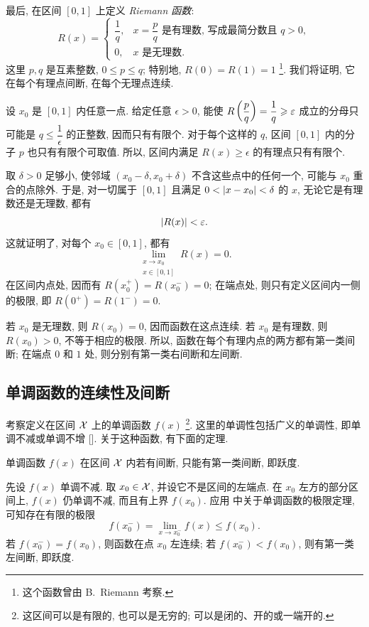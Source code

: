 \label{ex:riemann_function_continuity}
最后, 在区间 $[0,1]$ 上定义 \emph{Riemann 函数}:
$$
R(x)=
\begin{cases}
\dfrac1q, & x=\dfrac pq\text{ 是有理数, 写成最简分数且 }q>0,\\
0, & x\text{ 是无理数}.
\end{cases}
$$
这里 $p,q$ 是互素整数, $0\leq p\leq q$; 特别地, $R(0)=R(1)=1$
\footnote{这个函数曾由 B.\ Riemann 考察.}.
我们将证明, 它在每个有理点间断, 在每个无理点连续.

设 $x_0$ 是 $[0,1]$ 内任意一点. 给定任意 $\epsilon>0$,
能使
$
R\left( \dfrac pq \right)=\dfrac1q\geqslant\varepsilon
$
成立的分母只可能是 $q\leq\dfrac1\epsilon$ 的正整数, 因而只有有限个.
对于每个这样的 $q$, 区间 $[0,1]$ 内的分子 $p$ 也只有有限个可取值.
所以, 区间内满足 $R(x)\geq\epsilon$ 的有理点只有有限个.

取 $\delta>0$ 足够小, 使邻域 $(x_0-\delta,x_0+\delta)$
不含这些点中的任何一个, 可能与 $x_0$ 重合的点除外.
于是, 对一切属于 $[0,1]$ 且满足 $0<\left| x-x_0 \right|<\delta$ 的 $x$,
无论它是有理数还是无理数, 都有
$$
\left| R(x) \right|<\varepsilon.
$$
这就证明了, 对每个 $x_0\in[0,1]$, 都有
$$
\lim_{\substack{x\to x_0\\x\in[0,1]}}R(x)=0.
$$
在区间内点处, 因而有 $R(x_0^+)=R(x_0^-)=0$;
在端点处, 则只有定义区间内一侧的极限, 即 $R(0^+)=R(1^-)=0$.

若 $x_0$ 是无理数, 则 $R(x_0)=0$, 因而函数在这点连续.
若 $x_0$ 是有理数, 则 $R(x_0)>0$, 不等于相应的极限.
所以, 函数在每个有理内点的两方都有第一类间断;
在端点 $0$ 和 $1$ 处, 则分别有第一类右间断和左间断.

\subsection{单调函数的连续性及间断}\label{subsec:71}
考察定义在区间 $\mathcal{X}$ 上的单调函数 $f(x)$
\footnote{这区间可以是有限的, 也可以是无穷的; 可以是闭的、开的或一端开的.}.
这里的单调性包括广义的单调性, 即单调不减或单调不增
[]. 关于这种函数, 有下面的定理.

\myrefparagraph{1\textdegree}\label{thm:monotone_discontinuity}
{\kaishu 单调函数 $f(x)$ 在区间 $\mathcal{X}$ 内若有间断,
只能有第一类间断, 即跃度.}

先设 $f(x)$ 单调不减. 
取 $x_0\in\mathcal{X}$, 并设它不是区间的左端点.
在 $x_0$ 左方的部分区间上, $f(x)$ 仍单调不减, 而且有上界 $f(x_0)$.
应用  中关于单调函数的极限定理, 可知存在有限的极限
$$
f(x_0^-)=\lim_{x\to x_0^-}f(x)\leq f(x_0).
$$
若 $f(x_0^-)=f(x_0)$, 则函数在点 $x_0$ 左连续;
若 $f(x_0^-)<f(x_0)$, 则有第一类左间断, 即跃度.

